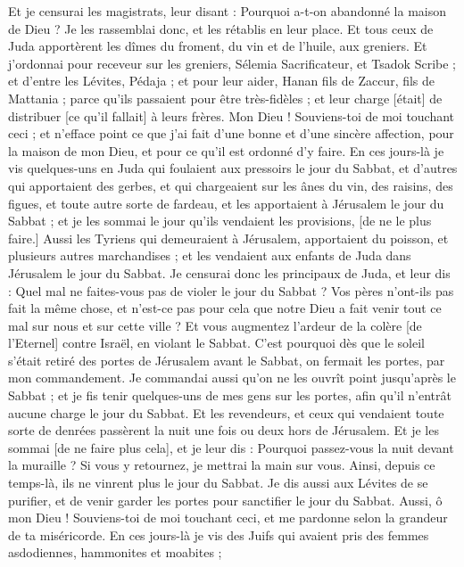 \begin{multicols}{2}
Et je censurai les magistrats, leur disant : Pourquoi a-t-on abandonné la maison de Dieu ? Je les rassemblai donc, et les rétablis en leur place.
Et tous ceux de Juda apportèrent les dîmes du froment, du vin et de l'huile, aux greniers.
Et j'ordonnai pour receveur sur les greniers, Sélemia Sacrificateur, et Tsadok Scribe ; et d'entre les Lévites, Pédaja ; et pour leur aider, Hanan fils de Zaccur, fils de Mattania ; parce qu'ils passaient pour être très-fidèles ; et leur charge [était] de distribuer [ce qu'il fallait] à leurs frères.
Mon Dieu ! Souviens-toi de moi touchant ceci ; et n'efface point ce que j'ai fait d'une bonne et d'une sincère affection, pour la maison de mon Dieu, et pour ce qu'il est ordonné d'y faire.
En ces jours-là je vis quelques-uns en Juda qui foulaient aux pressoirs le jour du Sabbat, et d'autres qui apportaient des gerbes, et qui chargeaient sur les ânes du vin, des raisins, des figues, et toute autre sorte de fardeau, et les apportaient à Jérusalem le jour du Sabbat ; et je les sommai le jour qu'ils vendaient les provisions, [de ne le plus faire.]
Aussi les Tyriens qui demeuraient à Jérusalem, apportaient du poisson, et plusieurs autres marchandises ; et les vendaient aux enfants de Juda dans Jérusalem le jour du Sabbat.
Je censurai donc les principaux de Juda, et leur dis : Quel mal ne faites-vous pas de violer le jour du Sabbat ?
Vos pères n'ont-ils pas fait la même chose, et n'est-ce pas pour cela que notre Dieu a fait venir tout ce mal sur nous et sur cette ville ? Et vous augmentez l'ardeur de la colère [de l'Eternel] contre Israël, en violant le Sabbat.
C'est pourquoi dès que le soleil s'était retiré des portes de Jérusalem avant le Sabbat, on fermait les portes, par mon commandement. Je commandai aussi qu'on ne les ouvrît point jusqu'après le Sabbat ; et je fis tenir quelques-uns de mes gens sur les portes, afin qu'il n'entrât aucune charge le jour du Sabbat.
Et les revendeurs, et ceux qui vendaient toute sorte de denrées passèrent la nuit une fois ou deux hors de Jérusalem.
Et je les sommai [de ne faire plus cela], et je leur dis : Pourquoi passez-vous la nuit devant la muraille ? Si vous y retournez, je mettrai la main sur vous. Ainsi, depuis ce temps-là, ils ne vinrent plus le jour du Sabbat.
Je dis aussi aux Lévites de se purifier, et de venir garder les portes pour sanctifier le jour du Sabbat. Aussi, ô mon Dieu ! Souviens-toi de moi touchant ceci, et me pardonne selon la grandeur de ta miséricorde.
En ces jours-là je vis des Juifs qui avaient pris des femmes asdodiennes, hammonites et moabites ;

\end{multicols}
